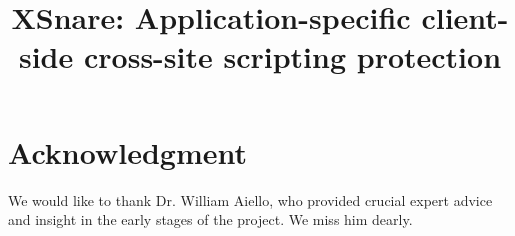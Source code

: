 \documentclass[10pt,conference, compsocconf]{IEEEtran}
\newcommand{\sys}[0]{XSnare\xspace}
\begin{document}
	\title{\sys: Application-specific client-side cross-site scripting protection}
	
	
	\author{
	}
	

	
	
	
	\maketitle
	
	\acresetall	%
	
	
	
	
	
	
	
	
	
	
	
	
	\section*{Acknowledgment}
	We would like to thank Dr. William Aiello, who provided crucial expert advice and insight in the early
	stages of the project. We miss him dearly.
	
	
\end{document}
